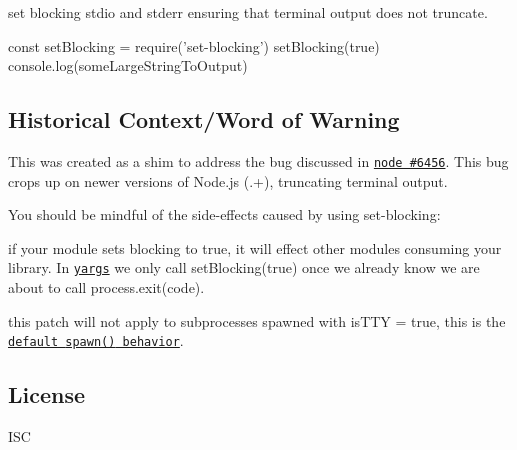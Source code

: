 \href{https://travis-ci.org/yargs/set-blocking}{\tt } \href{https://www.npmjs.com/package/set-blocking}{\tt } \href{https://coveralls.io/r/yargs/set-blocking?branch=master}{\tt } \href{https://github.com/conventional-changelog/standard-version}{\tt }

set blocking {\ttfamily stdio} and {\ttfamily stderr} ensuring that terminal output does not truncate.


\begin{DoxyCode}
const setBlocking = require('set-blocking')
setBlocking(true)
console.log(someLargeStringToOutput)
\end{DoxyCode}


\subsection*{Historical Context/\+Word of Warning}

This was created as a shim to address the bug discussed in \href{https://github.com/nodejs/node/issues/6456}{\tt node \#6456}. This bug crops up on newer versions of Node.\+js ({.+}), truncating terminal output.

You should be mindful of the side-\/effects caused by using {\ttfamily set-\/blocking}\+:


\begin{DoxyItemize}
\item if your module sets blocking to {\ttfamily true}, it will effect other modules consuming your library. In \href{https://github.com/yargs/yargs/blob/master/yargs.js#L653}{\tt yargs} we only call {\ttfamily set\+Blocking(true)} once we already know we are about to call {\ttfamily process.\+exit(code)}.
\item this patch will not apply to subprocesses spawned with {\ttfamily is\+T\+TY = true}, this is the \href{https://nodejs.org/api/child_process.html#child_process_child_process_spawn_command_args_options}{\tt default {\ttfamily spawn()} behavior}.
\end{DoxyItemize}

\subsection*{License}

I\+SC 